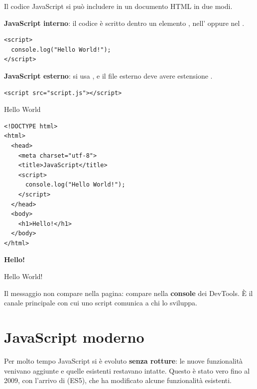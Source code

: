 Il codice JavaScript si può includere in un documento HTML in due modi.

\textbf{JavaScript interno}: il codice è scritto dentro un elemento ,
nell' oppure nel .

\begin{lstlisting}[style=html]
<script>
  console.log("Hello World!");
</script>
\end{lstlisting}

\textbf{JavaScript esterno}: si usa , e
il file esterno deve avere estensione .

\begin{lstlisting}[style=html]
<script src="script.js"></script>
\end{lstlisting}

\begin{esempio}{Hello World}
\begin{affianco}[0.5]
\begin{lstlisting}[style=html, name=hello.html]
<!DOCTYPE html>
<html>
  <head>
    <meta charset="utf-8">
    <title>JavaScript</title>
    <script>
      console.log("Hello World!");
    </script>
  </head>
  <body>
    <h1>Hello!</h1>
  </body>
</html>
\end{lstlisting}
\risultato
\begin{browser}[JavaScript]
  {\Lora\bfseries\Huge Hello!}
\end{browser}
\begin{console}
Hello World!
\end{console}
\end{affianco}

Il messaggio non compare nella pagina: compare nella \textbf{console} dei
DevTools. È il canale principale con cui uno script comunica a chi lo sviluppa.
\end{esempio}


\section{JavaScript moderno}

Per molto tempo JavaScript si è evoluto \textbf{senza rotture}: le nuove
funzionalità venivano aggiunte e quelle esistenti restavano intatte. Questo è
stato vero fino al 2009, con l'arrivo di  (ES5), che ha
modificato alcune funzionalità esistenti.

